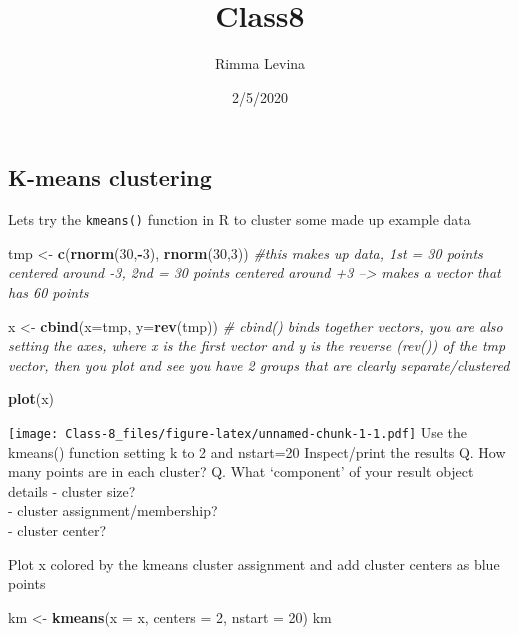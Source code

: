 \documentclass[]{article}
\title{Class8}
\author{Rimma Levina}
\date{2/5/2020}
\newenvironment{Shaded}{\begin{snugshade}}{\end{snugshade}}
\newcommand{\CommentTok}[1]{\textcolor[rgb]{0.56,0.35,0.01}{\textit{#1}}}
\newcommand{\DataTypeTok}[1]{\textcolor[rgb]{0.13,0.29,0.53}{#1}}
\newcommand{\DecValTok}[1]{\textcolor[rgb]{0.00,0.00,0.81}{#1}}
\newcommand{\KeywordTok}[1]{\textcolor[rgb]{0.13,0.29,0.53}{\textbf{#1}}}
\newcommand{\NormalTok}[1]{#1}
\newcommand{\OperatorTok}[1]{\textcolor[rgb]{0.81,0.36,0.00}{\textbf{#1}}}
\newcommand{\StringTok}[1]{\textcolor[rgb]{0.31,0.60,0.02}{#1}}
\begin{document}
\maketitle

\hypertarget{k-means-clustering}{%
\subsection{K-means clustering}\label{k-means-clustering}}

Lets try the \texttt{kmeans()} function in R to cluster some made up
example data

\begin{Shaded}
\begin{Highlighting}[]
\NormalTok{tmp <-}\StringTok{ }\KeywordTok{c}\NormalTok{(}\KeywordTok{rnorm}\NormalTok{(}\DecValTok{30}\NormalTok{,}\OperatorTok{-}\DecValTok{3}\NormalTok{), }\KeywordTok{rnorm}\NormalTok{(}\DecValTok{30}\NormalTok{,}\DecValTok{3}\NormalTok{)) }\CommentTok{#this makes up data, 1st = 30 points centered around -3, 2nd = 30 points centered around +3 --> makes a vector that has 60 points}

\NormalTok{x <-}\StringTok{ }\KeywordTok{cbind}\NormalTok{(}\DataTypeTok{x=}\NormalTok{tmp, }\DataTypeTok{y=}\KeywordTok{rev}\NormalTok{(tmp)) }\CommentTok{# cbind() binds together vectors, you are also setting the axes, where x is the first vector and y is the reverse (rev()) of the tmp vector, then you plot and see you have 2 groups that are clearly separate/clustered}
 
\KeywordTok{plot}\NormalTok{(x)}
\end{Highlighting}
\end{Shaded}

\texttt{[image: Class-8\_files/figure-latex/unnamed-chunk-1-1.pdf]} Use
the kmeans() function setting k to 2 and nstart=20 Inspect/print the
results Q. How many points are in each cluster? Q. What `component' of
your result object details - cluster size?\\
- cluster assignment/membership?\\
- cluster center?

Plot x colored by the kmeans cluster assignment and add cluster centers
as blue points

\begin{Shaded}
\begin{Highlighting}[]
\NormalTok{km <-}\StringTok{ }\KeywordTok{kmeans}\NormalTok{(}\DataTypeTok{x =}\NormalTok{ x, }\DataTypeTok{centers =} \DecValTok{2}\NormalTok{, }\DataTypeTok{nstart =} \DecValTok{20}\NormalTok{) }
\NormalTok{km}
\end{Highlighting}
\end{Shaded}
\end{document}
